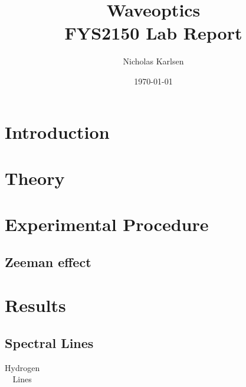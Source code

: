 \documentclass[11pt,a4paper]{article}
\begin{document}

\title{Waveoptics\\
\normalsize{FYS2150 Lab Report}}

\author{Nicholas Karlsen}

\date{\today}%

\maketitle

\begin{abstract}
\end{abstract}


\section{\label{sect:intro}Introduction}

\section{\label{sect:theory}Theory}
\section{\label{section:experimental}Experimental Procedure} 
  \subsection{Zeeman effect}
\section{\label{sect:results}Results}
  \subsection{\label{subsect:spectral}Spectral Lines}
  \begin{table}[H]
    \center
    \caption{Hydrogen Lines}
    \begin{tabular}{ l l l l}
      
    \end{tabular}
    \label{tab:hydrogen}
  \end{table}
\end{document}
